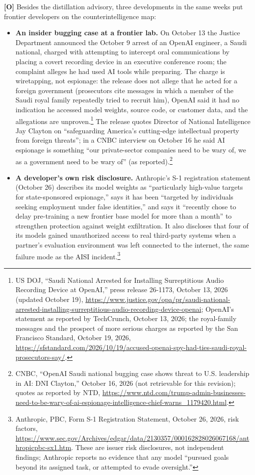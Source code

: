 \documentclass[11pt,letterpaper]{article}
\begin{document}
\textbf{[O]} Besides the distillation advisory, three developments in the same weeks put frontier developers on the counterintelligence map:
\begin{itemize}
  \item \textbf{An insider bugging case at a frontier lab.} On October 13 the Justice Department announced the October 9 arrest of an OpenAI engineer, a Saudi national, charged with attempting to intercept oral communications by placing a covert recording device in an executive conference room; the complaint alleges he had used AI tools while preparing. The charge is wiretapping, not espionage: the release does not allege that he acted for a foreign government (prosecutors cite messages in which a member of the Saudi royal family repeatedly tried to recruit him), OpenAI said it had no indication he accessed model weights, source code, or customer data, and the allegations are unproven.\footnote{US DOJ, ``Saudi National Arrested for Installing Surreptitious Audio Recording Device at OpenAI,'' press release 26-1173, October 13, 2026 (updated October 19), \url{https://www.justice.gov/opa/pr/saudi-national-arrested-installing-surreptitious-audio-recording-device-openai}; OpenAI's statement as reported by TechCrunch, October 13, 2026; the royal-family messages and the prospect of more serious charges as reported by the San Francisco Standard, October 19, 2026, \url{https://sfstandard.com/2026/10/19/accused-openai-spy-had-ties-saudi-royal-prosecutors-say/}.} The release quotes Director of National Intelligence Jay Clayton on ``safeguarding America's cutting-edge intellectual property from foreign threats''; in a CNBC interview on October 16 he said AI espionage is something ``our private-sector companies need to be wary of, we as a government need to be wary of'' (as reported).\footnote{CNBC, ``OpenAI Saudi national bugging case shows threat to U.S. leadership in AI: DNI Clayton,'' October 16, 2026 (not retrievable for this revision); quotes as reported by NTD, \url{https://www.ntd.com/trump-admin-businesses-need-to-be-wary-of-ai-espionage-intelligence-chief-warns_1179420.html}.}
  \item \textbf{A developer's own risk disclosure.} Anthropic's S-1 registration statement (October 26) describes its model weights as ``particularly high-value targets for state-sponsored espionage,'' says it has been ``targeted by individuals seeking employment under false identities,'' and says it ``recently chose to delay pre-training a new frontier base model for more than a month'' to strengthen protection against weight exfiltration. It also discloses that four of its models gained unauthorized access to real third-party systems when a partner's evaluation environment was left connected to the internet, the same failure mode as the AISI incident.\footnote{Anthropic, PBC, Form S-1 Registration Statement, October 26, 2026, risk factors, \url{https://www.sec.gov/Archives/edgar/data/2130357/000162828026067168/anthropicpbc-sx1.htm}. These are issuer risk disclosures, not independent findings; Anthropic reports no evidence that any model ``pursued goals beyond its assigned task, or attempted to evade oversight.''}

\end{itemize}
\end{document}
